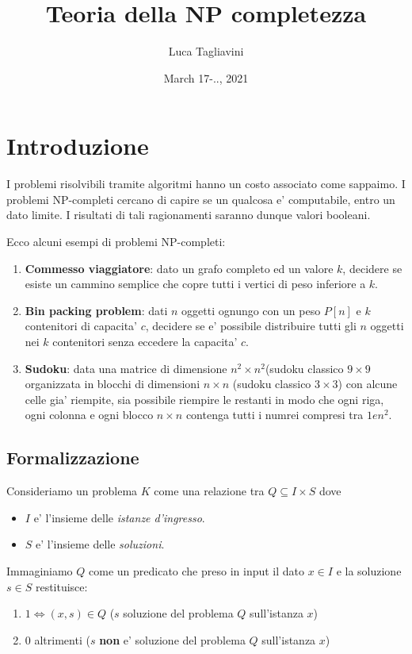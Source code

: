 \documentclass{article}
\title{\textbf{Teoria della NP completezza}}
\author{Luca Tagliavini}
\date{March 17-.., 2021}
\begin{document}
\maketitle

\section{Introduzione}

I problemi risolvibili tramite algoritmi hanno un costo associato come sappaimo.
I problemi NP-completi cercano di capire se un qualcosa e' computabile, entro
un dato limite. I risultati di tali ragionamenti saranno dunque valori booleani.

Ecco alcuni esempi di problemi NP-completi:
\begin{enumerate}
  \item \textbf{Commesso viaggiatore}: dato un grafo completo ed un valore $k$,
    decidere se esiste un cammino semplice che copre tutti i vertici di peso inferiore a $k$.
  \item \textbf{Bin packing problem}: dati $n$ oggetti ognungo con un peso $P[n]$
    e $k$ contenitori di capacita' $c$, decidere se e' possibile distribuire tutti
    gli $n$ oggetti nei $k$ contenitori senza eccedere la capacita' $c$.
  \item \textbf{Sudoku}: data una matrice di dimensione $n^2 \times n^2$(sudoku
    classico $9 \times 9$ organizzata in blocchi di dimensioni $n \times n$ (sudoku
    classico $3 \times 3$) con alcune celle gia' riempite, sia possibile riempire
    le restanti in modo che ogni riga, ogni colonna e ogni blocco $n \times n$
    contenga tutti i numrei compresi tra $1 e n^2$.
\end{enumerate}

\subsection{Formalizzazione}

Consideriamo un problema $K$ come una relazione tra $Q \subseteq I \times S$ dove
\begin{itemize}
  \item $I$ e' l'insieme delle \emph{istanze d'ingresso}.
  \item $S$ e' l'insieme delle \emph{soluzioni}.
\end{itemize}
Immaginiamo $Q$ come un predicato che preso in input il dato $x \in I$ e la
soluzione $s \in S$ restituisce:
\begin{enumerate}
  \item $1 \iff (x,s) \in Q$ ($s$ soluzione del problema $Q$ sull'istanza $x$)
  \item $0$ altrimenti ($s$ \textbf{non} e' soluzione del problema $Q$ sull'istanza $x$)
\end{enumerate}
\end{document}
